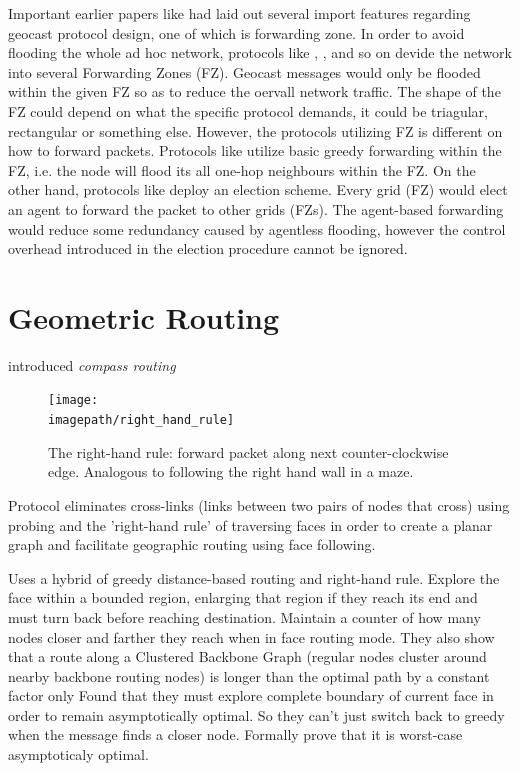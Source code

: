 \documentclass[conference]{IEEEtran}
\newcommand{\imagepath}{../../images/external/location_routing}
\begin{document}
Important earlier papers like \cite{Basagni1998} had laid out several import features regarding geocast protocol design, one of which is forwarding zone. In order to avoid flooding the whole ad hoc network, protocols like \cite{Basagni1998}, \cite{Camp2003}, \cite{Liao} and so on devide the network into several Forwarding Zones (FZ). Geocast messages would 
only be flooded within the given FZ so as to reduce the oervall network traffic. The shape of the FZ could depend on what the specific protocol demands, it could be triagular, rectangular or something else. However, the protocols utilizing FZ is different on how to forward packets. Protocols like \cite{Basagni1998} utilize basic greedy forwarding within
the FZ, i.e. the node will flood its all one-hop neighbours within the FZ. On the other hand, protocols like \cite{Liao} deploy an election scheme. Every grid (FZ) would elect an agent to forward the packet to other grids (FZs). The agent-based forwarding would reduce some redundancy caused by agentless flooding, however the control overhead 
introduced in the election procedure cannot be ignored.

\section{Geometric Routing}

\cite{Kranakis99compassrouting} introduced \emph{compass routing}

\begin{figure}
\label{fig:right-hand-rule}
\centering
\texttt{[image: \\imagepath/right\_hand\_rule]}
\caption{The right-hand rule: forward packet along next counter-clockwise edge. Analogous to following the right hand wall in a maze.}
\end{figure}

\cite{Kim:2005:GRM:1251203.1251219} Protocol eliminates cross-links (links between two pairs of nodes that cross) using probing and the 'right-hand rule' of traversing faces in order to create a planar graph and facilitate geographic routing using face following.

\cite{Kuhn2003} Uses a hybrid of greedy distance-based routing and right-hand rule.
Explore the face within a bounded region, enlarging that region if they reach its end and must turn back before reaching destination.
Maintain a counter of how many nodes closer and farther they reach when in face routing mode.
They also show that a route along a Clustered Backbone Graph (regular nodes cluster around nearby backbone routing nodes) is longer than the optimal path by a constant factor only
Found that they must explore complete boundary of current face in order to remain asymptotically optimal.
So they can't just switch back to greedy when the message finds a closer node.
Formally prove that it is worst-case asymptoticaly optimal.
\end{document}
